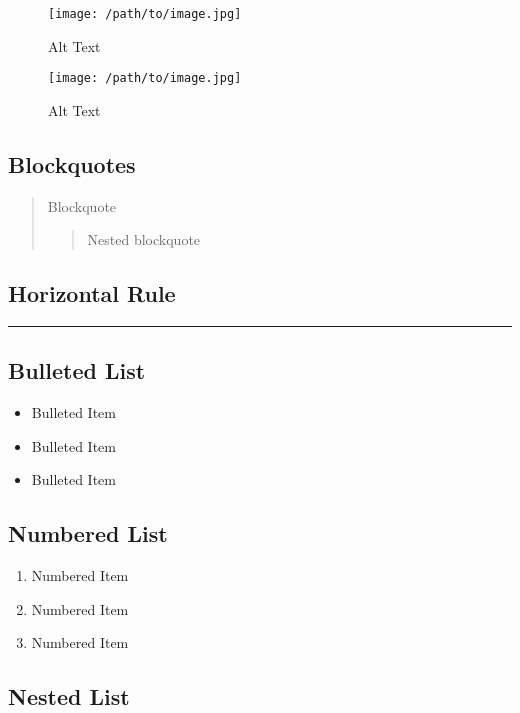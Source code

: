 \begin{figure}[htbp]
\centering
\texttt{[image: /path/to/image.jpg]}
\caption{Alt Text}
\end{figure}

\begin{figure}[htbp]
\centering
\texttt{[image: /path/to/image.jpg]}
\caption{Alt Text}
\end{figure}

\subsection{Blockquotes}

\begin{quote}
Blockquote
\begin{quote}
Nested blockquote
\end{quote}
\end{quote}

\subsection{Horizontal Rule}

\hrule

\subsection{Bulleted List}

\begin{itemize}
\item
  Bulleted Item
\item
  Bulleted Item
\item
  Bulleted Item
\end{itemize}

\subsection{Numbered List}

\begin{enumerate}
\def\labelenumi{\arabic{enumi}.}
\item
  Numbered Item
\item
  Numbered Item
\item
  Numbered Item
\end{enumerate}

\subsection{Nested List}

